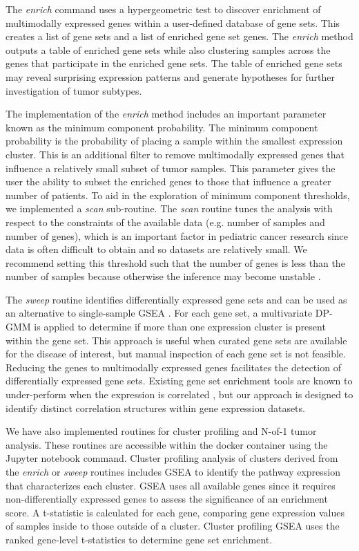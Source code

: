 \documentclass[10pt,letterpaper]{article}
\begin{document}
The \textit{enrich} command uses a hypergeometric test \cite{yuClusterProfilerPackageComparing2012} to discover enrichment of multimodally expressed genes within a user-defined database of gene sets. This creates a list of gene sets and a list of enriched gene set genes. The \textit{enrich} method outputs a table of enriched gene sets while also clustering samples across the genes that participate in the enriched gene sets. The table of enriched gene sets may reveal surprising expression patterns and generate hypotheses for further investigation of tumor subtypes.

The implementation of the \textit{enrich} method includes an important parameter known as the minimum component probability. The minimum component probability is the probability of placing a sample within the smallest expression cluster. This is an additional filter to remove multimodally expressed genes that influence a relatively small subset of tumor samples. This parameter gives the user the ability to subset the enriched genes to those that influence a greater number of patients. To aid in the exploration of minimum component thresholds, we implemented a \textit{scan} sub-routine. The \textit{scan} routine tunes the analysis with respect to the constraints of the available data (e.g. number of samples and number of genes), which is an important factor in pediatric cancer research since data is often difficult to obtain and so datasets are relatively small. We recommend setting this threshold such that the number of genes is less than the number of samples because otherwise the inference may become unstable \cite{caiConstrainedL1Minimization2011}.

The \textit{sweep} routine identifies differentially expressed gene sets and can be used as an alternative to single-sample GSEA \cite{subramanianGeneSetEnrichment2005}. For each gene set, a multivariate DP-GMM is applied to determine if more than one expression cluster is present within the gene set. This approach is useful when curated gene sets are available for the disease of interest, but manual inspection of each gene set is not feasible. Reducing the genes to multimodally expressed genes facilitates the detection of differentially expressed gene sets. Existing gene set enrichment tools are known to under-perform when the expression is correlated \cite{tamayoLimitationsSimpleGene2016}, but our approach is designed to identify distinct correlation structures within gene expression datasets.

We have also implemented routines for cluster profiling and N-of-1 tumor analysis. These routines are accessible within the docker container using the Jupyter notebook command. Cluster profiling analysis of clusters derived from the \textit{enrich} or \textit{sweep} routines includes GSEA \cite{korotkevichFastGeneSet2019} to identify the pathway expression that characterizes each cluster. GSEA uses all available genes since it requires non-differentially expressed genes to assess the significance of an enrichment score. A t-statistic is calculated for each gene, comparing gene expression values of samples inside to those outside of a cluster. Cluster profiling GSEA uses the ranked gene-level t-statistics to determine gene set enrichment.
\end{document}
